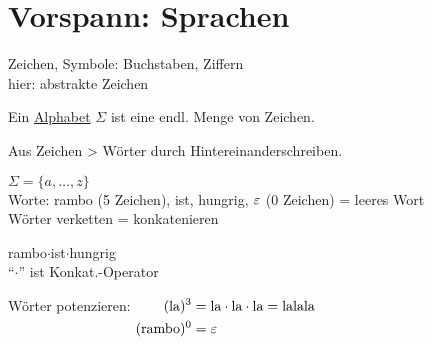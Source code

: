 \section[Vorspann: Sprachen]{Vorspann: Sprachen}
Zeichen, Symbole: Buchstaben, Ziffern\\
hier: abstrakte Zeichen
\begin{Def}[name={[Alphabet $\Sigma$]}]
	Ein \underline{Alphabet} $\Sigma$ ist eine endl. Menge von Zeichen.
	
	Aus Zeichen \-> Wörter durch Hintereinanderschreiben.
\end{Def} %
\begin{Bsp*} $\Sigma = \{a,\dots,z\}$\\
	Worte: rambo (5 Zeichen), ist, hungrig, \qquad $\varepsilon$ (0 Zeichen) = leeres Wort\\
	Wörter verketten = konkatenieren
\end{Bsp*}
\begin{Bsp*} rambo$\cdot$ist$\cdot$hungrig\\
	"`$\cdot$"' ist Konkat.-Operator
	
	Wörter potenzieren: $\begin{aligned}[t]
	(\text{la})^3 &= \text{la}\cdot\text{la}\cdot\text{la} = \text{lalala}\\
	(\text{rambo})^0 &= \varepsilon
	\end{aligned}$
\end{Bsp*}

